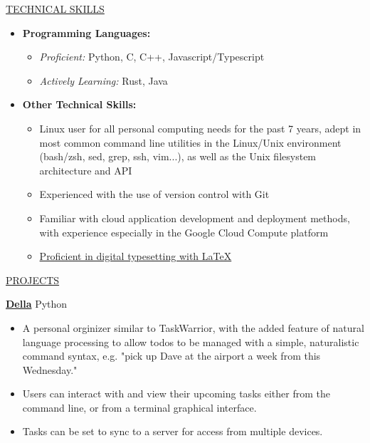 \documentclass[11pt]{article}
\newcommand{\betteruline}[1]{
    \uline{#1}
}
\newcommand{\sectiontitle}[1]{
    \begingroup
        \titlebold
        \betteruline{\Large\uppercase{#1}  }
        \vspace{1.7mm}
    \endgroup
}
\newcommand{\sectioncontent}[1]{
    \begingroup
        \begin{FlushLeft}
        \vspace{-3mm}
        \sffamily\small#1
        \end{FlushLeft}
    \endgroup
    \vspace{2mm}
}
\newcommand{\project}[2]{
    \begingroup
        \textbf{\small#1}
        \hfill\color{black!70}\small{#2}
    \endgroup
}
\newcommand{\spacevv}{
    \vspace{2mm}
}
\begin{document}
\begin{paracol}{2}
{\begin{itemize}
      \end{itemize}
    }

    \switchcolumn

    
    \sectiontitle{Technical Skills}
    \sectioncontent{
      \begin{itemize}
        \item \textbf{Programming Languages: }
          \begin{itemize}
            \item \textit{Proficient:} Python, C, C++, Javascript/Typescript
            \item \textit{Actively Learning:} Rust, Java
          \end{itemize}

        \item \textbf{Other Technical Skills:}
          \begin{itemize}
            \item  Linux user for all personal computing needs for the past 7 years, adept in most common command line utilities in the Linux/Unix environment (bash/zsh, sed, grep, ssh, vim...), as well as the Unix filesystem architecture and API
            \item Experienced with the use of version control with Git
            \item Familiar with cloud application development and deployment methods, with experience especially in the Google Cloud Compute platform
            \item \href{https://github.com/keagud/resume}{Proficient in digital typesetting with \LaTeX}
          \end{itemize}
      \end{itemize}
    }
    \sectiontitle{projects}
    \sectioncontent{
      \project{\href{https://github.com/keagud/della}{Della}}{Python}
        \begin{itemize}
          \item A personal orginizer similar to TaskWarrior, with the added feature of natural language processing to allow todos to be managed with a simple, naturalistic command syntax, e.g. "pick up Dave at the airport a week from this Wednesday." 
          \item Users can interact with and view their upcoming tasks either from the command line, or from a terminal graphical interface. 
          \item Tasks can be set to sync to a server for access from multiple devices.
        \end{itemize}
        \spacevv
        
}
\end{paracol}
\end{document}
